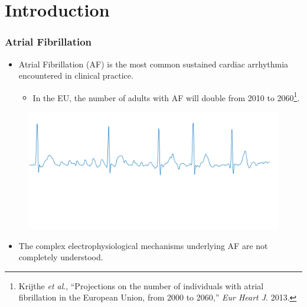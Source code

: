 \documentclass{beamer}
\begin{document}
\section{Introduction} 
	
	\begin{frame}
		\frametitle{Atrial Fibrillation}	
		
		\begin{itemize}
			\item Atrial Fibrillation (AF) is the most common sustained cardiac arrhythmia encountered in clinical practice.
			\begin{itemize}
				\item  In the EU, the number of adults with AF will double from 2010 to 2060\footnote{Krijthe \textit{et al}., ``Projections on the number of individuals with atrial fibrillation in the European Union, from 2000 to 2060,'' \textit{Eur Heart J}. 2013.}.
			\end{itemize}
		\end{itemize}
		\begin{figure}
			\centering
			\includegraphics[scale=0.2]{AF_ECG-eps-converted-to.pdf}
		\end{figure}
		\vspace{-0.8in}	
		\begin{itemize}
			\item The complex electrophysiological mechanisms underlying AF are not completely understood.
		\end{itemize}
	\end{frame}
\end{document}

